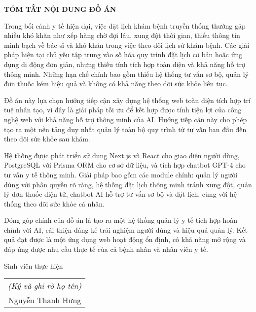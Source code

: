 \documentclass[../DoAn.tex]{subfiles}
\begin{document}
\begin{center}
    \Large{\textbf{TÓM TẮT NỘI DUNG ĐỒ ÁN}}\\
\end{center}
\vspace{1cm}

Trong bối cảnh y tế hiện đại, việc đặt lịch khám bệnh truyền thống thường gặp nhiều khó khăn như xếp hàng chờ đợi lâu, xung đột thời gian, thiếu thông tin minh bạch về bác sĩ và khó khăn trong việc theo dõi lịch sử khám bệnh. Các giải pháp hiện tại chủ yếu tập trung vào số hóa quy trình đặt lịch cơ bản hoặc ứng dụng di động đơn giản, nhưng thiếu tính tích hợp toàn diện và khả năng hỗ trợ thông minh. Những hạn chế chính bao gồm thiếu hệ thống tư vấn sơ bộ, quản lý đơn thuốc kém hiệu quả và không có khả năng theo dõi sức khỏe liên tục.

Đồ án này lựa chọn hướng tiếp cận xây dựng hệ thống web toàn diện tích hợp trí tuệ nhân tạo, vì đây là giải pháp tối ưu để kết hợp được tính tiện lợi của công nghệ web với khả năng hỗ trợ thông minh của AI. Hướng tiếp cận này cho phép tạo ra một nền tảng duy nhất quản lý toàn bộ quy trình từ tư vấn ban đầu đến theo dõi sức khỏe sau khám.

Hệ thống được phát triển sử dụng Next.js và React cho giao diện người dùng, PostgreSQL với Prisma ORM cho cơ sở dữ liệu, và tích hợp chatbot GPT-4 cho tư vấn y tế thông minh. Giải pháp bao gồm các module chính: quản lý người dùng với phân quyền rõ ràng, hệ thống đặt lịch thông minh tránh xung đột, quản lý đơn thuốc điện tử, chatbot AI hỗ trợ tư vấn sơ bộ và đặt lịch, cùng với hệ thống theo dõi sức khỏe cá nhân.

Đóng góp chính của đồ án là tạo ra một hệ thống quản lý y tế tích hợp hoàn chỉnh với AI, cải thiện đáng kể trải nghiệm người dùng và hiệu quả quản lý. Kết quả đạt được là một ứng dụng web hoạt động ổn định, có khả năng mở rộng và đáp ứng được nhu cầu thực tế của cả bệnh nhân và nhân viên y tế.

\begin{flushright}
Sinh viên thực hiện\\
\begin{tabular}{@{}c@{}}
\textit{(Ký và ghi rõ họ tên)}\\
Nguyễn Thanh Hưng
\end{tabular}
\end{flushright}
\end{document}
